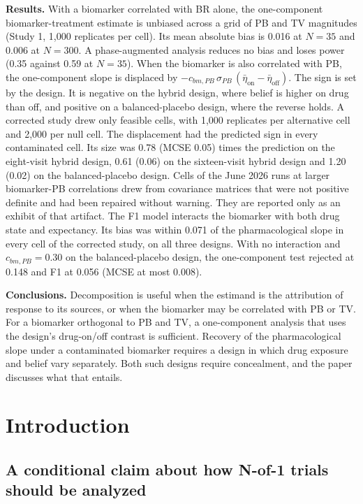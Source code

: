 \documentclass[
  11pt,
]{article}
\begin{document}
\textbf{Results.} With a biomarker correlated with BR alone, the
one-component biomarker-treatment estimate is unbiased across a grid of
PB and TV magnitudes (Study 1, 1,000 replicates per cell). Its mean
absolute bias is 0.016 at \(N = 35\) and 0.006 at \(N = 300\). A phase-augmented
analysis reduces no bias and loses power (0.35 against 0.59 at
\(N = 35\)). When the biomarker is also correlated with PB, the
one-component slope is displaced by \(-c_{bm,PB}\,\sigma_{PB}\,
(\bar\eta_{\text{on}} - \bar\eta_{\text{off}})\). The sign is set by the
design. It is negative on the hybrid design, where belief is higher on
drug than off, and positive on a balanced-placebo design, where the
reverse holds. A corrected study drew only feasible cells, with 1,000
replicates per alternative cell and 2,000 per null cell. The
displacement had the predicted sign in every contaminated cell. Its
size was 0.78 (MCSE 0.05) times
the prediction on the eight-visit hybrid design,
0.61 (0.06) on the sixteen-visit
hybrid design and 1.20 (0.02) on
the balanced-placebo design. Cells of the June 2026 runs at larger
biomarker-PB correlations drew from covariance matrices that were not
positive definite and had been repaired without warning. They are
reported only as an exhibit of that artifact. The F1 model interacts the
biomarker with both drug state and expectancy. Its bias was within
0.071 of the pharmacological slope in every cell of the
corrected study, on all three designs. With no interaction and
\(c_{bm,PB} = 0.30\) on the balanced-placebo design, the one-component
test rejected at
0.148
and F1 at 0.056
(MCSE at most
0.008).

\textbf{Conclusions.} Decomposition is useful when the estimand is the
attribution of response to its sources, or when the biomarker may be
correlated with PB or TV. For a biomarker orthogonal to PB and TV, a
one-component analysis that uses the design's drug-on/off contrast is
sufficient. Recovery of the pharmacological slope under a contaminated
biomarker requires a design in which drug exposure and belief vary
separately. Both such designs require concealment, and the paper
discusses what that entails.

\section{Introduction}\label{introduction}

\subsection{A conditional claim about how N-of-1 trials should be analyzed}\label{a-conditional-claim-about-how-n-of-1-trials-should-be-analyzed}
\end{document}
